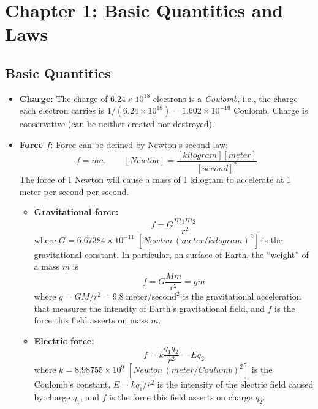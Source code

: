 \documentclass{article}
\begin{document}
\section*{Chapter 1: Basic Quantities and Laws}

\subsection*{Basic Quantities}

\begin{itemize}

\item {\bf Charge:} The charge of $6.24 \times 10^{18}$ electrons is a 
  {\em Coulomb}, i.e., the charge each electron carries is 
  $1/ (6.24 \times 10^{18})=1.602 \times 10^{-19}$ Coulomb. Charge is 
  conservative (can be neither created nor destroyed).

\item {\bf Force $f$:} Force can be defined by Newton's second law: 
  \begin{equation} 
    f=ma,\;\;\;\;\;\;\;[Newton]=\frac{[kilogram][meter]}{[second]^2}	
  \end{equation}
  The force of 1 Newton will cause a mass of 1 kilogram to accelerate
  at 1 meter per second per second. 

  \begin{itemize}
  \item {\bf Gravitational force:}
    \begin{equation}	
      f=G\frac{m_1m_2}{r^2}	
    \end{equation}
    where $G=6.67384\times 10^{-11}$ $[Newton\,(meter/kilogram)^2]$ is
    the gravitational constant.
    In particular, on surface of Earth, the ``weight'' of a mass $m$ is
    \begin{equation}	
      f=G\frac{Mm}{r^2}=gm	
    \end{equation}
    where $g=GM/r^2=9.8\;\mbox{meter}/\mbox{second}^2$ is the gravitational 
    acceleration that measures the intensity of Earth's gravitational field,
    and $f$ is the force this field asserts on mass $m$.
  \item{\bf Electric force:}
    \begin{equation}	
      f=k\frac{q_1q_2}{r^2}=Eq_2	
    \end{equation}
    where $k=8.98755\times 10^9$ $[Newton\,(meter/Coulumb)^2]$ is the
    Coulomb's constant, $E=kq_1/r^2$ is the intensity of the electric 
    field caused by charge $q_1$, and $f$ is the force this field asserts
    on charge $q_2$.
  \end{itemize}


\end{itemize}
\end{document}
